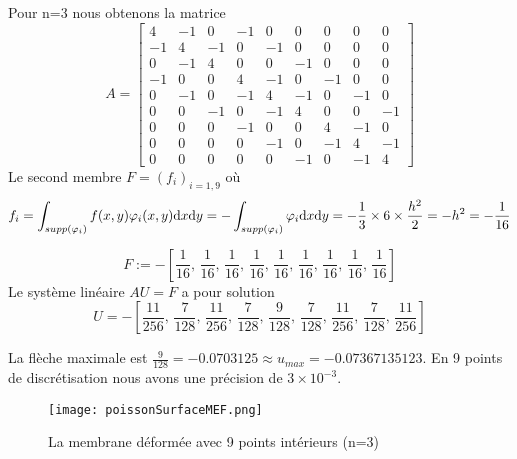 \documentclass{article}
\def \de {{\rm d}}
\begin{document}
Pour n=3 nous obtenons la matrice
\[
 A=\left[ 
{\begin{array}{rrrrrrrrr}
4 & -1 & 0 & -1 & 0 & 0 & 0 & 0 & 0 \\
-1 & 4 & -1 & 0 & -1 & 0 & 0 & 0 & 0 \\
0 & -1 & 4 & 0 & 0 & -1 & 0 & 0 & 0 \\
-1 & 0 & 0 & 4 & -1 & 0 & -1 & 0 & 0 \\
0 & -1 & 0 & -1 & 4 & -1 & 0 & -1 & 0 \\
0 & 0 & -1 & 0 & -1 & 4 & 0 & 0 & -1 \\
0 & 0 & 0 & -1 & 0 & 0 & 4 & -1 & 0 \\
0 & 0 & 0 & 0 & -1 & 0 & -1 & 4 & -1 \\
0 & 0 & 0 & 0 & 0 & -1 & 0 & -1 & 4
\end{array}}
 \right] 
\]
Le second membre $F=(f_i)_{i=1,9}$ où 
\[f_i=\int_{supp(\varphi_i)}f(x,y)\varphi_i(x,y)\de x\de y=-\int_{supp(\varphi_i)}\varphi_i\de x\de y=-\frac{1}{3}\times 6\times\frac{h^2}{2}=-h^2=-\frac{1}{16}\]

\[
F := -\left[{\displaystyle \frac {1}{16}} , \,{\displaystyle \frac {1}{
16}} , \,{\displaystyle \frac {1}{16}} , \,{\displaystyle \frac {
1}{16}} , \,{\displaystyle \frac {1}{16}} , \,{\displaystyle 
\frac {1}{16}} , \,{\displaystyle \frac {1}{16}} , \,
{\displaystyle \frac {1}{16}} , \,{\displaystyle \frac {1}{16}} \right]
\]
Le système linéaire $AU=F$ a pour solution
\[
 U=-\left[  \! {\displaystyle \frac {11}{256}} , \,{\displaystyle 
\frac {7}{128}} , \,{\displaystyle \frac {11}{256}} , \,
{\displaystyle \frac {7}{128}} , \,{\displaystyle \frac {9}{128}
} , \,{\displaystyle \frac {7}{128}} , \,{\displaystyle \frac {11
}{256}} , \,{\displaystyle \frac {7}{128}} , \,{\displaystyle 
\frac {11}{256}}  \!  \right] 
\]

La flèche maximale est $\frac{9}{128} = -0.0703125\approx u_{max}=-0.07367135123$. En 9 points de discrétisation nous avons une précision de $3\times 10^{-3}$.

\begin{figure}[!h] %
 
\centering
 
\texttt{[image: poissonSurfaceMEF.png]}
 
 
\caption{La membrane déformée avec 9 points intérieurs (n=3)}
 
\label{membraneDéformée}
 
\end{figure}
\end{document}
